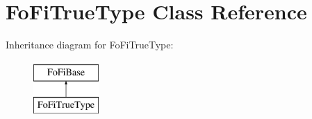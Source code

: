 \hypertarget{class_fo_fi_true_type}{}\section{Fo\+Fi\+True\+Type Class Reference}
\label{class_fo_fi_true_type}
Inheritance diagram for Fo\+Fi\+True\+Type\+:\begin{figure}[H]
\begin{center}
\leavevmode
\includegraphics[height=2.000000cm]{class_fo_fi_true_type}
\end{center}
\end{figure}
